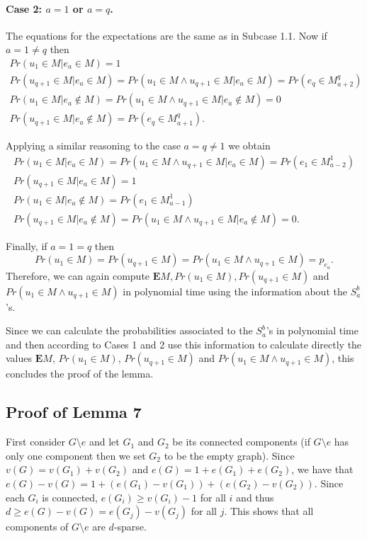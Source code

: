 \documentclass[12pt]{article}
\newcommand{\Ep}[1]{\mathbf{E}#1}
\begin{document}
	\paragraph{Case 2: $a = 1$ or $a = q$.} The equations for the expectations are the same as in Subcase 1.1. Now if $a = 1 \neq q$ then 
\begin{gather*}
		Pr(u_1 \in M | e_a \in M) = 1 \\
		Pr(u_{q + 1} \in M | e_a \in M) = Pr(u_1 \in M \wedge u_{q + 1} \in M | e_a \in M) = Pr(e_q \in M_{a + 2}^q)\\
		Pr(u_1 \in M |e_a \notin M) = Pr(u_1 \in M \wedge u_{q + 1} \in M | e_a \notin M) = 0 \\
		Pr(u_{q + 1} \in M | e_a \notin M) = Pr(e_q \in M_{a + 1}^q).
	\end{gather*}
		
	Applying a similar reasoning to the case $a = q \neq 1$ we obtain
\begin{gather*}
		Pr(u_1 \in M | e_a \in M) = Pr(u_1 \in M \wedge u_{q + 1} \in M | e_a \in M) = Pr(e_1 \in M_{a - 2}^1) \\
		Pr(u_{q + 1} \in M | e_a \in M) = 1\\
		Pr(u_1 \in M |e_a \notin M) = Pr(e_1 \in M_{a - 1}^1)\\
		Pr(u_{q + 1} \in M | e_a \notin M) = Pr(u_1 \in M \wedge u_{q + 1} \in M | e_a \notin M) = 0.
	\end{gather*}
	
	Finally, if $a = 1 = q$ then $$Pr(u_1 \in M) = Pr(u_{q + 1} \in M) = Pr(u_1 \in M \wedge u_{q + 1} \in M) = p_{e_a}.$$ Therefore, we can again compute $\Ep{M}, Pr(u_1 \in M), Pr(u_{q+1} \in M)$ and $Pr(u_1 \in M \wedge u_{q + 1} \in M)$ in polynomial time using the information about the $S_a^b$'s. 
	
	\bigskip Since we can calculate the probabilities associated to the $S_a^b$'s in polynomial time and then according to Cases 1 and 2 use this information to calculate directly the values $\Ep{M}$, $Pr(u_1 \in M)$, $Pr(u_{q + 1} \in M)$ and $Pr(u_1 \in M \wedge u_{q + 1} \in M)$, this concludes the proof of the lemma.


	\subsection{Proof of Lemma 7}

		First consider $G \setminus e$ and let $G_1$ and $G_2$ be its connected components (if $G \setminus e$ has only one component then we set $G_2$ to be the empty graph). Since $v(G) = v(G_1) + v(G_2)$ and $e(G) = 1 + e(G_1) + e(G_2)$, we have that $e(G) - v(G) = 1 + (e(G_1) - v(G_1)) + (e(G_2) - v(G_2))$. Since each $G_i$ is connected, $e(G_i) \ge v(G_i) - 1$ for all $i$ and thus $d \ge e(G) - v(G) = e(G_j) - v(G_j)$ for all $j$. This shows that all components of $G \setminus e$ are $d$-sparse. 
		
\end{document}
